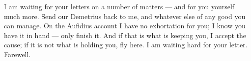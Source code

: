 

 I am waiting for your letters on a number of matters --- and for you yourself much more. Send our Demetrius back to me, and whatever else of any good you can manage. On the Aufidius account I have no exhortation for you; I know you have it in hand --- only finish it. And if that is what is keeping you, I accept the cause; if it is not what is holding you, fly here. I am waiting hard for your letter. Farewell.
